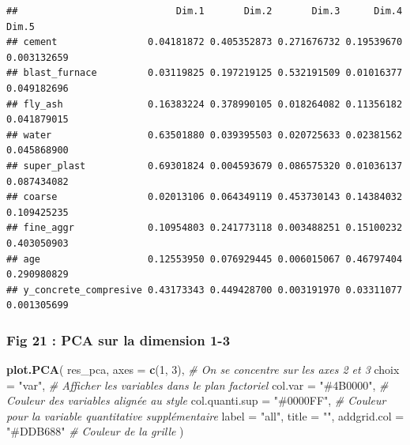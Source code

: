 \documentclass[
  12pt,
]{article}
\newenvironment{Shaded}{\begin{snugshade}}{\end{snugshade}}
\newcommand{\AttributeTok}[1]{\textcolor[rgb]{0.13,0.29,0.53}{#1}}
\newcommand{\CommentTok}[1]{\textcolor[rgb]{0.56,0.35,0.01}{\textit{#1}}}
\newcommand{\DecValTok}[1]{\textcolor[rgb]{0.00,0.00,0.81}{#1}}
\newcommand{\FunctionTok}[1]{\textcolor[rgb]{0.13,0.29,0.53}{\textbf{#1}}}
\newcommand{\NormalTok}[1]{#1}
\newcommand{\StringTok}[1]{\textcolor[rgb]{0.31,0.60,0.02}{#1}}
\begin{document}
\begin{verbatim}
##                            Dim.1       Dim.2       Dim.3      Dim.4       Dim.5
## cement                0.04181872 0.405352873 0.271676732 0.19539670 0.003132659
## blast_furnace         0.03119825 0.197219125 0.532191509 0.01016377 0.049182696
## fly_ash               0.16383224 0.378990105 0.018264082 0.11356182 0.041879015
## water                 0.63501880 0.039395503 0.020725633 0.02381562 0.045868900
## super_plast           0.69301824 0.004593679 0.086575320 0.01036137 0.087434082
## coarse                0.02013106 0.064349119 0.453730143 0.14384032 0.109425235
## fine_aggr             0.10954803 0.241773118 0.003488251 0.15100232 0.403050903
## age                   0.12553950 0.076929445 0.006015067 0.46797404 0.290980829
## y_concrete_compresive 0.43173343 0.449428700 0.003191970 0.03311077 0.001305699
\end{verbatim}

\subsubsection{Fig 21 : PCA sur la dimension
1-3}\label{fig-21-pca-sur-la-dimension-1-3}

\begin{Shaded}
\begin{Highlighting}[]
\FunctionTok{plot.PCA}\NormalTok{(}
\NormalTok{    res\_pca,}
    \AttributeTok{axes =} \FunctionTok{c}\NormalTok{(}\DecValTok{1}\NormalTok{, }\DecValTok{3}\NormalTok{),             }\CommentTok{\# On se concentre sur les axes 2 et 3}
    \AttributeTok{choix =} \StringTok{"var"}\NormalTok{,              }\CommentTok{\# Afficher les variables dans le plan factoriel}
    \AttributeTok{col.var =} \StringTok{"\#4B0000"}\NormalTok{,        }\CommentTok{\# Couleur des variables alignée au style}
    \AttributeTok{col.quanti.sup =} \StringTok{"\#0000FF"}\NormalTok{, }\CommentTok{\# Couleur pour la variable quantitative supplémentaire}
    \AttributeTok{label =} \StringTok{"all"}\NormalTok{,}
    \AttributeTok{title =} \StringTok{""}\NormalTok{,}
    \AttributeTok{addgrid.col =} \StringTok{"\#DDB688"}     \CommentTok{\# Couleur de la grille}
\NormalTok{  )}
\end{Highlighting}
\end{Shaded}
\end{document}
